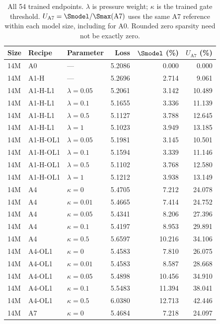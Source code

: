 \begin{table}[p]\centering\small\renewcommand{\arraystretch}{0.95}
\caption{All 54 trained endpoints. $\lambda$ is pressure weight; $\kappa$ is the trained gate threshold. $U_{\mathrm{A7}}=\Smodel/\Smax(\mathrm{A7})$ uses the same A7 reference within each model size, including for A0. Rounded zero sparsity need not be exactly zero.}\label{tab:trained-endpoints}
\begin{tabular}{@{}lllrrr@{}}
\toprule
Size & Recipe & Parameter & Loss & $\Smodel$ (\%) & $U_{\mathrm{A7}}$ (\%) \\
\midrule
14M & A0 & --- & 5.2086 & 0.000 & 0.000 \\
14M & A1-H & --- & 5.2696 & 2.714 & 9.061 \\
14M & A1-H-L1 & $\lambda=0.05$ & 5.2061 & 3.142 & 10.489 \\
14M & A1-H-L1 & $\lambda=0.1$ & 5.1655 & 3.336 & 11.139 \\
14M & A1-H-L1 & $\lambda=0.5$ & 5.1127 & 3.788 & 12.645 \\
14M & A1-H-L1 & $\lambda=1$ & 5.1023 & 3.949 & 13.185 \\
14M & A1-H-OL1 & $\lambda=0.05$ & 5.1981 & 3.145 & 10.501 \\
14M & A1-H-OL1 & $\lambda=0.1$ & 5.1594 & 3.339 & 11.146 \\
14M & A1-H-OL1 & $\lambda=0.5$ & 5.1102 & 3.768 & 12.580 \\
14M & A1-H-OL1 & $\lambda=1$ & 5.1212 & 3.938 & 13.149 \\
14M & A4 & $\kappa=0$ & 5.4705 & 7.212 & 24.078 \\
14M & A4 & $\kappa=0.01$ & 5.4665 & 7.414 & 24.752 \\
14M & A4 & $\kappa=0.05$ & 5.4341 & 8.206 & 27.396 \\
14M & A4 & $\kappa=0.1$ & 5.4197 & 8.953 & 29.891 \\
14M & A4 & $\kappa=0.5$ & 5.6597 & 10.216 & 34.106 \\
14M & A4-OL1 & $\kappa=0$ & 5.4583 & 7.810 & 26.075 \\
14M & A4-OL1 & $\kappa=0.01$ & 5.4583 & 8.587 & 28.668 \\
14M & A4-OL1 & $\kappa=0.05$ & 5.4898 & 10.456 & 34.910 \\
14M & A4-OL1 & $\kappa=0.1$ & 5.5483 & 11.394 & 38.041 \\
14M & A4-OL1 & $\kappa=0.5$ & 6.0380 & 12.713 & 42.446 \\
14M & A7 & $\kappa=0$ & 5.4684 & 7.218 & 24.097 \\

\end{tabular}
\end{table}
